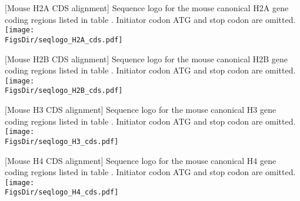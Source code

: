 
\newpage
\begin{minipage}{\textwidth}
\begin{center}
  [Mouse H2A CDS alignment]{
    Sequence logo for the mouse canonical H2A gene coding regions
    listed in table .
    Initiator codon ATG and stop codon are omitted.
  }
  \texttt{[image: \\FigsDir/seqlogo\_H2A\_cds.pdf]}
\end{center}
\end{minipage}

\newpage
\begin{minipage}{\textwidth}
\begin{center}
  [Mouse H2B CDS alignment]{
    Sequence logo for the mouse canonical H2B gene coding regions
    listed in table .
    Initiator codon ATG and stop codon are omitted.
  }
  \texttt{[image: \\FigsDir/seqlogo\_H2B\_cds.pdf]}
\end{center}
\end{minipage}

\newpage
\begin{minipage}{\textwidth}
\begin{center}
  [Mouse H3 CDS alignment]{
    Sequence logo for the mouse canonical H3 gene coding regions
    listed in table .
    Initiator codon ATG and stop codon are omitted.
  }
  \texttt{[image: \\FigsDir/seqlogo\_H3\_cds.pdf]}
\end{center}
\end{minipage}

\newpage
\begin{minipage}{\textwidth}
\begin{center}
  [Mouse H4 CDS alignment]{
    Sequence logo for the mouse canonical H4 gene coding regions
    listed in table .
    Initiator codon ATG and stop codon are omitted.
  }
  \texttt{[image: \\FigsDir/seqlogo\_H4\_cds.pdf]}
\end{center}
\end{minipage}

